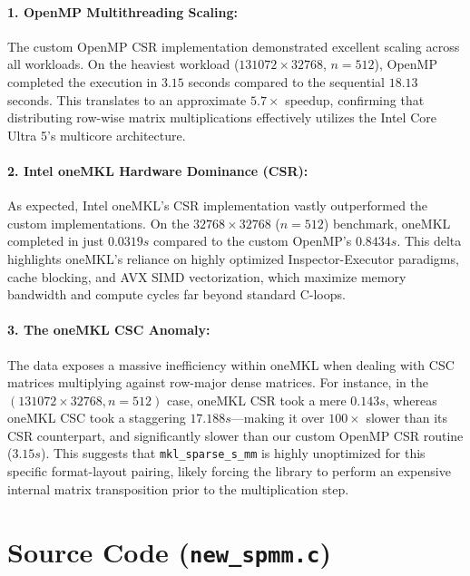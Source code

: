 \documentclass[a4paper,11pt]{article}
\begin{document}
\paragraph{1. OpenMP Multithreading Scaling:} 
The custom OpenMP CSR implementation demonstrated excellent scaling across all workloads. On the heaviest workload ($131072 \times 32768$, $n=512$), OpenMP completed the execution in $3.15$ seconds compared to the sequential $18.13$ seconds. This translates to an approximate $5.7 \times$ speedup, confirming that distributing row-wise matrix multiplications effectively utilizes the Intel Core Ultra 5's multicore architecture.

\paragraph{2. Intel oneMKL Hardware Dominance (CSR):} 
As expected, Intel oneMKL's CSR implementation vastly outperformed the custom implementations. On the $32768 \times 32768$ ($n=512$) benchmark, oneMKL completed in just $0.0319s$ compared to the custom OpenMP's $0.8434s$. This delta highlights oneMKL's reliance on highly optimized Inspector-Executor paradigms, cache blocking, and AVX SIMD vectorization, which maximize memory bandwidth and compute cycles far beyond standard C-loops.

\paragraph{3. The oneMKL CSC Anomaly:} 
The data exposes a massive inefficiency within oneMKL when dealing with CSC matrices multiplying against row-major dense matrices. For instance, in the $(131072 \times 32768, n=512)$ case, oneMKL CSR took a mere $0.143s$, whereas oneMKL CSC took a staggering $17.188s$—making it over $100\times$ slower than its CSR counterpart, and significantly slower than our custom OpenMP CSR routine ($3.15s$). This suggests that \texttt{mkl\_sparse\_s\_mm} is highly unoptimized for this specific format-layout pairing, likely forcing the library to perform an expensive internal matrix transposition prior to the multiplication step.

\newpage
\appendix
\section{Source Code (\texttt{new\_spmm.c})}
\inputminted{c}{new_spmm.c}
\end{document}
